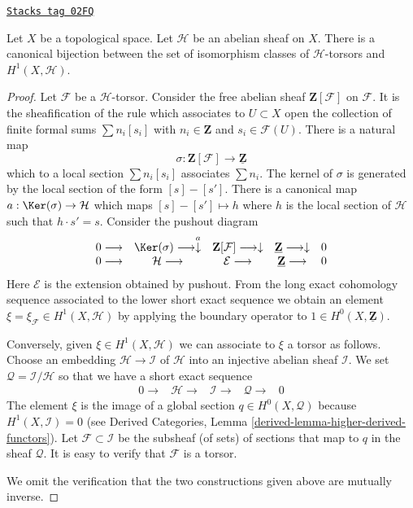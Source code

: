 \begin{lemma}[Torsors h1]
\label{cohomology-lemma-torsors-h1}
\href{https://stacks.math.columbia.edu/tag/02FQ}{\texttt{Stacks tag 02FQ}}

Let $X$ be a topological space.
Let $\mathcal{H}$ be an abelian sheaf on $X$.
There is a canonical bijection between the set of isomorphism
classes of $\mathcal{H}$-torsors and $H^1(X, \mathcal{H})$.
\end{lemma}

\begin{proof}
Let $\mathcal{F}$ be a $\mathcal{H}$-torsor.
Consider the free abelian sheaf $\mathbf{Z}[\mathcal{F}]$
on $\mathcal{F}$. It is the sheafification of the rule
which associates to $U \subset X$ open the collection of finite
formal sums $\sum n_i[s_i]$ with $n_i \in \mathbf{Z}$
and $s_i \in \mathcal{F}(U)$. There is a natural map
$$
\sigma : \mathbf{Z}[\mathcal{F}] \longrightarrow \underline{\mathbf{Z}}
$$
which to a local section $\sum n_i[s_i]$ associates $\sum n_i$.
The kernel of $\sigma$ is generated by the local section of the form
$[s] - [s']$. There is a canonical map
$a : \Ker(\sigma) \to \mathcal{H}$
which maps $[s] - [s'] \mapsto h$ where $h$ is the local section of
$\mathcal{H}$ such that $h \cdot s' = s$. Consider the pushout diagram
$$
\begin{array}{ccccc}0 \longrightarrow & \Ker(\sigma) \longrightarrow\overset{a}{\downarrow} & \mathbf{Z}[\mathcal{F}] \longrightarrow\downarrow & \underline{\mathbf{Z}} \longrightarrow\downarrow & 0 \\ 0 \longrightarrow & \mathcal{H} \longrightarrow & \mathcal{E} \longrightarrow & \underline{\mathbf{Z}} \longrightarrow & 0\end{array}
$$
Here $\mathcal{E}$ is the extension obtained by pushout.
From the long exact cohomology sequence associated to the lower
short exact sequence we obtain an element
$\xi = \xi_\mathcal{F} \in H^1(X, \mathcal{H})$
by applying the boundary operator to $1 \in H^0(X, \underline{\mathbf{Z}})$.

\medskip\noindent
Conversely, given $\xi \in H^1(X, \mathcal{H})$ we can associate to
$\xi$ a torsor as follows. Choose an embedding $\mathcal{H} \to \mathcal{I}$
of $\mathcal{H}$ into an injective abelian sheaf $\mathcal{I}$. We set
$\mathcal{Q} = \mathcal{I}/\mathcal{H}$ so that we have a short exact
sequence
$$
\begin{array}{ccccc}0 \longrightarrow & \mathcal{H} \longrightarrow & \mathcal{I} \longrightarrow & \mathcal{Q} \longrightarrow & 0\end{array}
$$
The element $\xi$ is the image of a global section $q \in H^0(X, \mathcal{Q})$
because $H^1(X, \mathcal{I}) = 0$ (see
Derived Categories, Lemma \ref{derived-lemma-higher-derived-functors}).
Let $\mathcal{F} \subset \mathcal{I}$ be the subsheaf (of sets) of sections
that map to $q$ in the sheaf $\mathcal{Q}$. It is easy to verify that
$\mathcal{F}$ is a torsor.

\medskip\noindent
We omit the verification that the two constructions given
above are mutually inverse.
\end{proof}


